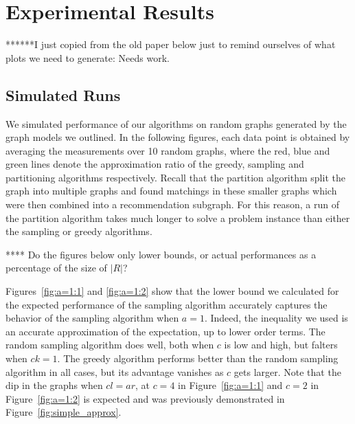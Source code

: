 \section{Experimental Results}

******I just copied from the old paper below just to remind ourselves of what plots we need to generate: Needs work.


\subsection{Simulated Runs}
We simulated performance of our algorithms on random graphs generated
by the graph models we outlined. In the following figures, each data
point is obtained by averaging the measurements over 10 random
graphs,  where the red, blue and green lines denote the approximation
ratio of the greedy, sampling and partitioning algorithms respectively.
Recall that the partition algorithm split the graph into multiple graphs and found
matchings in these smaller graphs which were then combined into a
recommendation subgraph. For this reason, a run of the partition
algorithm takes much longer to solve a problem instance than either the
sampling or greedy algorithms.




**** Do the figures below only lower bounds, or actual performances as a percentage of the size of $|R|$?


Figures~\ref{fig:a=1:1} and \ref{fig:a=1:2} show that the
lower bound we calculated for the expected performance of the sampling
algorithm accurately captures the behavior of the sampling algorithm
when $a=1$. Indeed, the inequality we used is an accurate
approximation of the expectation, up to lower order terms. The random
sampling algorithm does well, both when $c$ is low and high, but
falters when $ck=1$. The greedy algorithm performs better than the
random sampling algorithm in all cases, but its advantage vanishes as
$c$ gets larger. Note that the dip in the graphs when $cl=ar$, at
$c=4$ in Figure~\ref{fig:a=1:1} and $c=2$ in Figure~\ref{fig:a=1:2} is
expected and was previously demonstrated in Figure~\ref{fig:simple_approx}.

